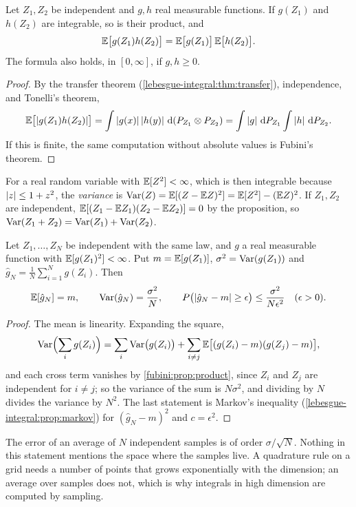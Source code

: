 \begin{notechapter}
\begin{proposition}\label{fubini:prop:product}
Let $Z_1, Z_2$ be independent and $g, h$ real measurable functions. If
$g(Z_1)$ and $h(Z_2)$ are integrable, so is their product, and
\[
  \mathbb{E}\bigl[g(Z_1)h(Z_2)\bigr] = \mathbb{E}\bigl[g(Z_1)\bigr]\,\mathbb{E}\bigl[h(Z_2)\bigr] .
\]
The formula also holds, in $[0, \infty]$, if $g, h\geq0$.
\end{proposition}

\begin{proof}
By the transfer theorem (\cref{lebesgue-integral:thm:transfer}),
independence, and Tonelli's theorem,
\[
  \mathbb{E}\bigl[\left|g(Z_1)h(Z_2)\right|\bigr]
  = \int\left|g(x)\right|\left|h(y)\right|\,\mathrm{d}(P_{Z_1}\otimes P_{Z_2})
  = \int\left|g\right|\,\mathrm{d} P_{Z_1}\int\left|h\right|\,\mathrm{d} P_{Z_2} .
\]
If this is finite, the same computation without absolute values is
Fubini's theorem.
\end{proof}

For a real random variable with $\mathbb{E}[Z^2] < \infty$, which is then
integrable because $\left|z\right|\leq1 + z^2$, the \emph{variance} is
$\operatorname{Var}(Z) = \mathbb{E}[(Z - \mathbb{E} Z)^2] = \mathbb{E}[Z^2] - (\mathbb{E} Z)^2$. If $Z_1, Z_2$ are
independent,
$\mathbb{E}[(Z_1 - \mathbb{E} Z_1)(Z_2 - \mathbb{E} Z_2)] = 0$ by the proposition, so
$\operatorname{Var}(Z_1 + Z_2) = \operatorname{Var}(Z_1) + \operatorname{Var}(Z_2)$.

\begin{theorem}\label{fubini:thm:mc}
Let $Z_1,\dots,Z_N$ be independent with the same law, and $g$ a real
measurable function with $\mathbb{E}[g(Z_1)^2] < \infty$. Put
$m = \mathbb{E}[g(Z_1)]$, $\sigma^2 = \operatorname{Var}(g(Z_1))$ and
$\hat g_N = \frac1N\sum_{i=1}^Ng(Z_i)$. Then
\[
  \mathbb{E}[\hat g_N] = m , \qquad \operatorname{Var}(\hat g_N) = \frac{\sigma^2}N , \qquad
  P\bigl(\left|\hat g_N - m\right|\geq\epsilon\bigr)
  \leq\frac{\sigma^2}{N\epsilon^2}\quad(\epsilon > 0) .
\]
\end{theorem}

\begin{proof}
The mean is linearity. Expanding the square,
\[
  \operatorname{Var}\Bigl(\sum_ig(Z_i)\Bigr) = \sum_i\operatorname{Var}\bigl(g(Z_i)\bigr)
  + \sum_{i\neq j}\mathbb{E}\bigl[(g(Z_i) - m)(g(Z_j) - m)\bigr] ,
\]
and each
cross term vanishes by \cref{fubini:prop:product}, since $Z_i$ and
$Z_j$ are independent for $i\neq j$; so the
variance of the sum is $N\sigma^2$, and dividing by $N$ divides the
variance by $N^2$. The last statement is Markov's inequality
(\cref{lebesgue-integral:prop:markov}) for $(\hat g_N - m)^2$ and
$c = \epsilon^2$.
\end{proof}

\begin{intuition}
The error of an average of $N$ independent samples is of order
$\sigma/\sqrt N$. Nothing in this statement mentions the space where the
samples live. A quadrature rule on a grid needs a number of points that
grows exponentially with the dimension; an average over samples does
not, which is why integrals in high dimension are computed by sampling.
\end{intuition}


\end{notechapter}
